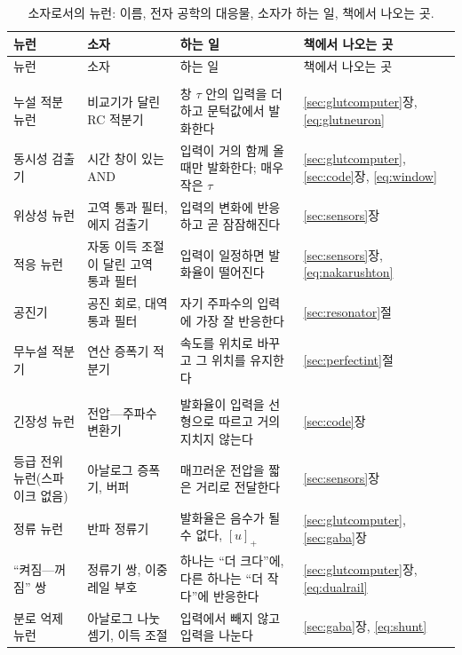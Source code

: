 \begin{center}
\footnotesize
\setlength{\tabcolsep}{3pt}
\renewcommand{\arraystretch}{1.15}
\begin{longtable}{>{\raggedright}p{3.1cm}>{\raggedright}p{3.3cm}>{\raggedright}p{4.7cm}>{\raggedright\arraybackslash}p{2.4cm}}
\caption{소자로서의 뉴런: 이름, 전자 공학의 대응물, 소자가 하는 일, 책에서 나오는 곳.}\label{tab:eetypes}\\
\toprule
뉴런 & 소자 & 하는 일 & 책에서 나오는 곳 \\
\midrule
\endfirsthead
\toprule
뉴런 & 소자 & 하는 일 & 책에서 나오는 곳 \\
\midrule
\endhead
\bottomrule
\endfoot
\multicolumn{4}{l}{\emph{필터와 적분기}} \\
누설 적분 뉴런 & 비교기가 달린 RC 적분기 & 창 $\tau$ 안의 입력을 더하고 문턱값에서 발화한다 & \ref{sec:glutcomputer}장, \eqref{eq:glutneuron} \\
동시성 검출기 & 시간 창이 있는 AND & 입력이 거의 함께 올 때만 발화한다; 매우 작은 $\tau$ & \ref{sec:glutcomputer}, \ref{sec:code}장, \eqref{eq:window} \\
위상성 뉴런 & 고역 통과 필터, 에지 검출기 & 입력의 변화에 반응하고 곧 잠잠해진다 & \ref{sec:sensors}장 \\
적응 뉴런 & 자동 이득 조절이 달린 고역 통과 필터 & 입력이 일정하면 발화율이 떨어진다 & \ref{sec:sensors}장, \eqref{eq:nakarushton} \\
공진기 & 공진 회로, 대역 통과 필터 & 자기 주파수의 입력에 가장 잘 반응한다 & \ref{sec:resonator}절 \\
무누설 적분기 & 연산 증폭기 적분기 & 속도를 위치로 바꾸고 그 위치를 유지한다 & \ref{sec:perfectint}절 \\
\midrule
\multicolumn{4}{l}{\emph{변환기}} \\
긴장성 뉴런 & 전압---주파수 변환기 & 발화율이 입력을 선형으로 따르고 거의 지치지 않는다 & \ref{sec:code}장 \\
등급 전위 뉴런(스파이크 없음) & 아날로그 증폭기, 버퍼 & 매끄러운 전압을 짧은 거리로 전달한다 & \ref{sec:sensors}장 \\
정류 뉴런 & 반파 정류기 & 발화율은 음수가 될 수 없다, $[u]_+$ & \ref{sec:glutcomputer}, \ref{sec:gaba}장 \\
“켜짐---꺼짐” 쌍 & 정류기 쌍, 이중 레일 부호 & 하나는 “더 크다”에, 다른 하나는 “더 작다”에 반응한다 & \ref{sec:glutcomputer}장, \eqref{eq:dualrail} \\
분로 억제 뉴런 & 아날로그 나눗셈기, 이득 조절 & 입력에서 빼지 않고 입력을 나눈다 & \ref{sec:gaba}장, \eqref{eq:shunt} \\

\end{longtable}
\end{center}
